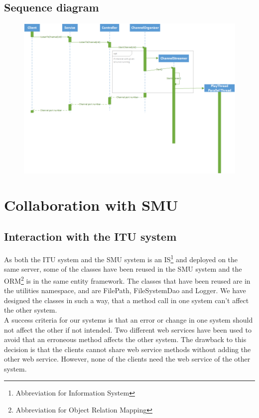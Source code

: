 \documentclass[a4paper,11pt,report]{article}
\begin{document}
\begin{landscape}
\subsection{Sequence diagram}
\begin{figure}[H]
\includegraphics[]{./ListenToChannelSD.png}
\end{figure}
\end{landscape}


\section{Collaboration with SMU}

\subsection{Interaction with the ITU system}
As both the ITU system and the SMU system is an IS\footnote[2]{Abbreviation for Information System} and deployed on the same server, some of the classes have been reused in the SMU system and the ORM\footnote[3]{Abbreviation for Object Relation Mapping} is in the same entity framework.
The classes that have been reused are in the utilities namespace, and are FilePath, FileSystemDao and Logger. We have designed the classes in such a way, that a method call in one system can't affect the other system. \\
A success criteria for our systems is that an error or change in one system should not affect the other if not intended. Two different web services have been used to avoid that an erroneous method affects the other system.
The drawback to this decision is that the clients cannot share web service methods without adding the other web service. However, none of the clients need the web service of the other system. 
\end{document}
